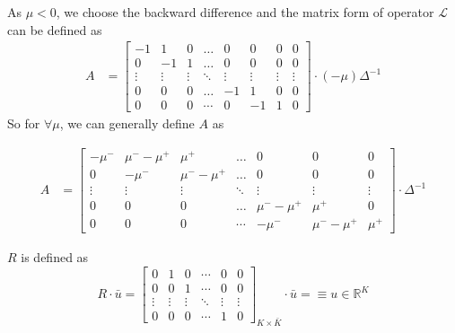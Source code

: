 \documentclass[11pt]{article}
\newcommand{\R}{\ensuremath{\mathbb{R}}}
\begin{document}
As $\mu<0$, we choose the backward difference and the matrix form of operator $\mathcal{L}$ can be defined as
\begin{align}
A &= \begin{bmatrix}
-1&1&0&\dots&0&0&0&0\\
0&-1&1&\dots&0&0&0&0\\
\vdots&\vdots&\vdots&\ddots&\vdots&\vdots&\vdots&\vdots\\
0&0&0&\dots&-1&1&0&0\\
0&0&0&\cdots&0&-1&1&0
\end{bmatrix}\cdot (-\mu)\Delta^{-1}
\end{align}
So for $\forall\mu$, we can generally define $A$ as

\begin{align}
A &= \begin{bmatrix}
-\mu^-&\mu^--\mu^+&\mu^+&\dots&0&0&0\\
0&-\mu^-&\mu^--\mu^+&\dots&0&0&0\\
\vdots&\vdots&\vdots&\ddots&\vdots&\vdots&\vdots\\
0&0&0&\dots&\mu^--\mu^+&\mu^+&0\\
0&0&0&\cdots&-\mu^-&\mu^--\mu^+&\mu^+
\end{bmatrix}\cdot \Delta^{-1}
\end{align}

$R$ is defined as
\begin{equation}
R\cdot \bar{u} =\begin{bmatrix}
0&1&0&\cdots&0&0\\
0&0&1&\cdots&0&0\\
\vdots&\vdots&\vdots&\ddots&\vdots&\vdots\\
0&0&0&\cdots&1&0
\end{bmatrix}_{K\times\bar{K}}\cdot \bar{u}
=\equiv u\in \R^{K}
\end{equation}
\end{document}
